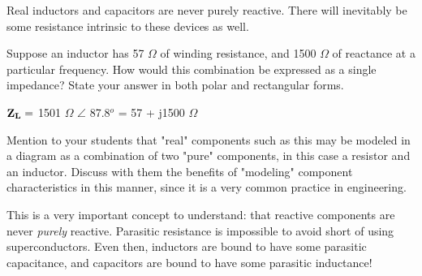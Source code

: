 

Real inductors and capacitors are never purely reactive.  There will inevitably be some resistance intrinsic to these devices as well.

Suppose an inductor has 57 $\Omega$ of winding resistance, and 1500 $\Omega$ of reactance at a particular frequency.  How would this combination be expressed as a single impedance?  State your answer in both polar and rectangular forms.







${\bf Z_L} =$ 1501 $\Omega$ $\angle$ 87.8$^{o}$ = 57 + j1500 $\Omega$







Mention to your students that "real" components such as this may be modeled in a diagram as a combination of two "pure" components, in this case a resistor and an inductor.  Discuss with them the benefits of "modeling" component characteristics in this manner, since it is a very common practice in engineering.

This is a very important concept to understand: that reactive components are never {\it purely} reactive.  Parasitic resistance is impossible to avoid short of using superconductors.  Even then, inductors are bound to have some parasitic capacitance, and capacitors are bound to have some parasitic inductance!




